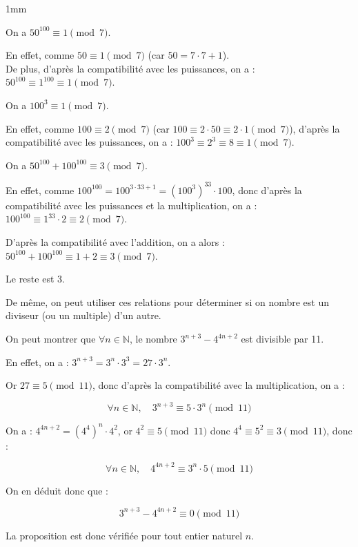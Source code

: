 \begin{exemples}{1mm}
	\item  On a $50^{100} \equiv 1 \pmod 7$.
	 
	 En effet, comme  $50 \equiv 1 \pmod 7$ (car $50 = 7  \cdot 7 + 1$).	\\
	 De plus, d'après la compatibilité avec les puissances, on a : $50^{100} \equiv 1^{100} \equiv 1 \pmod 7$.
	
	
	\vspace{0.3cm}
	
	\item  On a $100^{3} \equiv 1 \pmod 7$.
	
	 En effet, comme $100 \equiv 2 \pmod 7$ (car $100 \equiv 2\cdot 50 \equiv 2\cdot 1 \pmod 7$), d'après la compatibilité avec les puissances, on a :
	$100^3 \equiv 2^3 \equiv 8 \equiv 1 \pmod 7$.
	
	\vspace{0.3cm}
	
	\item  On a $50^{100} + 100^{100} \equiv  3 \pmod 7$.
	
	 En effet, comme $100^{100} = 100^{3  \cdot 33 + 1} = \left(100^3\right)^{33}  \cdot 100$, donc d'après la compatibilité avec les puissances et la multiplication, on a : $100^{100} \equiv 1^{33} \cdot 2 \equiv 2 \pmod 7$.
	
	D'après la compatibilité avec l'addition, on a alors : $50^{100} + 100^{100} \equiv 1 + 2 \equiv 3 \pmod 7$.
	
	Le reste est 3.
\end{exemples}

\vspace{5mm}

De même, on peut utiliser ces relations pour déterminer si on nombre est un diviseur (ou un multiple) d'un autre.

\vspace{5mm}

\begin{exemple}
	On peut montrer que $\forall n \in \mathbb{N}$, le nombre $3^{n+3}-4^{4 n+2}$  est divisible par 11.
	
	\smallskip \smallskip
	
	
	En effet, on a : $3^{n+3} = 3^n \cdot 3^3 = 27 \cdot 3^n$.
	
	Or $27 \equiv 5 \pmod{11}$, donc d'après la compatibilité avec la multiplication, on a :
	
	$$\forall n \in \mathbb{N}, \quad 3^{n+3} \equiv 5 \cdot 3^n \pmod{11}$$
	
	On a : $4^{4n+2} = \left(4^4\right)^n \cdot 4^2$, or $4^2 \equiv 5 \pmod{11}$ donc $4^4 \equiv 5^2 \equiv 3 \pmod{11}$, donc :
	
	$$\forall n \in \mathbb{N}, \quad 4^{4n+2} \equiv 3^n \cdot 5 \pmod{11}$$
	
	On en déduit donc que :
	
	$$3^{n+3} - 4^{4n+2} \equiv 0 \pmod{11}$$
	
	La proposition est donc vérifiée pour tout entier naturel $n$.
\end{exemple}

